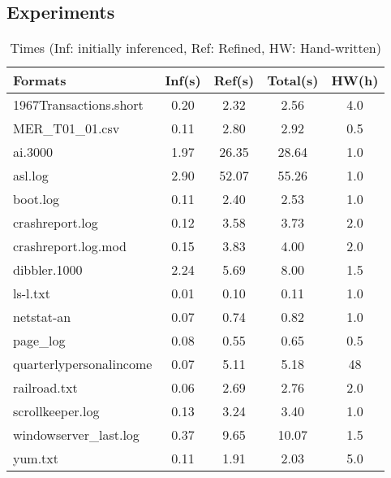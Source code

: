 \subsection{Experiments}
\begin{table}
\begin{center}
\begin{tabular}{|l||c|c|c|c|} \hline
Formats 	 		& Inf(s)     & Ref(s) 	& Total(s)  & HW(h)\\ \hline \hline
1967Transactions.short          & 0.20&      2.32&      2.56 	& 4.0 	 \\ \hline
MER\_T01\_01.csv                & 0.11&      2.80&      2.92 	& 0.5 	 \\ \hline
ai.3000                         & 1.97&      26.35&     28.64	& 1.0 	 \\ \hline
asl.log                         & 2.90&      52.07&     55.26	& 1.0 	 \\ \hline
boot.log                        & 0.11&      2.40&      2.53 	& 1.0 	 \\ \hline
crashreport.log                 & 0.12&      3.58&      3.73 	& 2.0 	 \\ \hline
crashreport.log.mod             & 0.15&      3.83&      4.00 	& 2.0 	 \\ \hline
dibbler.1000                    & 2.24&      5.69&      8.00 	& 1.5 	 \\ \hline
ls-l.txt                        & 0.01&      0.10&      0.11 	& 1.0 	 \\ \hline
netstat-an                      & 0.07&      0.74&      0.82 	& 1.0 	 \\ \hline
page\_log                       & 0.08&      0.55&      0.65 	& 0.5 	 \\ \hline
quarterlypersonalincome         & 0.07&      5.11&      5.18 	& 48  	 \\ \hline
railroad.txt                    & 0.06&      2.69&      2.76 	& 2.0 	 \\ \hline
scrollkeeper.log                & 0.13&      3.24&      3.40 	& 1.0 	 \\ \hline
windowserver\_last.log          & 0.37&      9.65&      10.07	& 1.5 	 \\ \hline
yum.txt                         & 0.11&      1.91&      2.03 	& 5.0 	 \\ \hline
\end{tabular}
\caption{Times (Inf: initially inferenced, Ref: Refined, HW: Hand-written)}
\label{tab:times}
\end{center}
\end{table}

